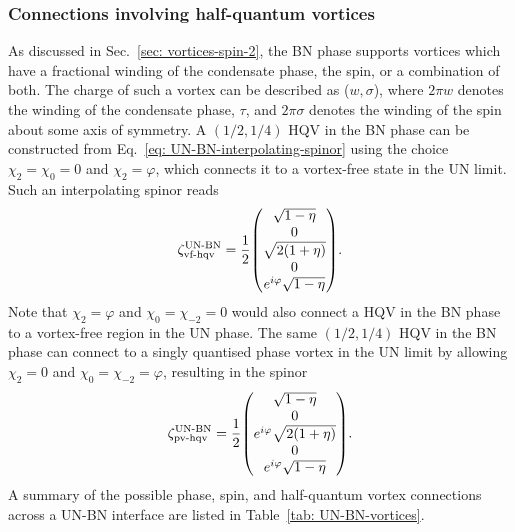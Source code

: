 \subsubsection{Connections involving half-quantum vortices}
As discussed in Sec.~\ref{sec: vortices-spin-2}, the BN phase supports vortices
which have a fractional winding of the condensate phase, the spin, or a
combination of both.
The charge of such a vortex can be described as (\(w, \sigma\)), where
\(2\pi w\) denotes the winding of the condensate phase, \(\tau\), and
\(2\pi\sigma\) denotes the winding of the spin about some axis of symmetry.
A \((1/2, 1/4)\) HQV in the BN phase can be constructed from
Eq.~\eqref{eq: UN-BN-interpolating-spinor} using the choice \(\chi_2=\chi_0=0\)
and \(\chi_2=\varphi\), which connects it to a vortex-free state in the UN
limit.
Such an interpolating spinor reads
\begin{align}
    \zeta^\text{UN-BN}_\text{vf-hqv} = \frac{1}{2}\mqty(
        \sqrt{1-\eta} \\
        0 \\
        \sqrt{2(1+\eta)} \\
        0 \\
        e^{i\varphi}\sqrt{1-\eta}
    ).
\end{align}
Note that \(\chi_2=\varphi\) and \(\chi_0=\chi_{-2}=0\) would also connect
a HQV in the BN phase to a vortex-free region in the UN phase.
The same \((1/2, 1/4)\) HQV in the BN phase can connect to a singly quantised
phase vortex in the UN limit by allowing \(\chi_2=0\) and
\(\chi_0=\chi_{-2}=\varphi\), resulting in the spinor
\begin{align}
    \zeta^\text{UN-BN}_\text{pv-hqv} = \frac{1}{2}\mqty(
        \sqrt{1-\eta} \\
        0 \\
        e^{i\varphi}\sqrt{2(1+\eta)} \\
        0 \\
        e^{i\varphi}\sqrt{1-\eta}
    ).
\end{align}
A summary of the possible phase, spin, and half-quantum vortex connections
across a UN-BN interface are listed in Table~\ref{tab: UN-BN-vortices}.
